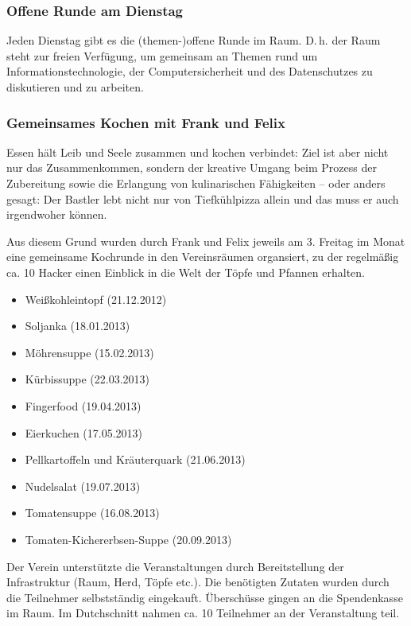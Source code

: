 \documentclass[10pt,DIV16]{scrartcl}
\begin{document}
\subsubsection{Offene Runde am Dienstag}

Jeden Dienstag gibt es die (themen-)offene Runde im Raum. D.\,h. der Raum
steht zur freien Verfügung, um gemeinsam an Themen rund um
Informationstechnologie, der Computersicherheit und des
Datenschutzes zu diskutieren und zu arbeiten.

\subsubsection{Gemeinsames Kochen mit Frank und Felix}

Essen hält Leib und Seele zusammen und kochen verbindet:
Ziel ist aber nicht nur das Zusammenkommen, sondern der kreative Umgang
beim Prozess der Zubereitung sowie die Erlangung von kulinarischen
Fähigkeiten -- oder anders gesagt: Der Bastler lebt nicht nur von
Tiefkühlpizza allein und das muss er auch irgendwoher können.

Aus diesem Grund wurden durch Frank und Felix jeweils am 3. Freitag
im Monat eine gemeinsame Kochrunde in den Vereinsräumen organsiert,
zu der regelmäßig ca. 10 Hacker einen Einblick in die Welt der Töpfe
und Pfannen erhalten.

\begin{itemize}
	\item Weißkohleintopf (21.12.2012)
	\item Soljanka (18.01.2013)
	\item Möhrensuppe (15.02.2013)
	\item Kürbissuppe (22.03.2013)
	\item Fingerfood (19.04.2013)
	\item Eierkuchen (17.05.2013)
	\item Pellkartoffeln und Kräuterquark (21.06.2013)
	\item Nudelsalat (19.07.2013)
	\item Tomatensuppe (16.08.2013)
	\item Tomaten-Kichererbsen-Suppe (20.09.2013)
\end{itemize}

Der Verein unterstützte die Veranstaltungen durch Bereitstellung der
Infrastruktur (Raum, Herd, Töpfe etc.). Die benötigten Zutaten wurden
durch die Teilnehmer selbstständig eingekauft. Überschüsse gingen an
die Spendenkasse im Raum. Im Dutchschnitt nahmen ca. 10 Teilnehmer an
der Veranstaltung teil.
\end{document}
